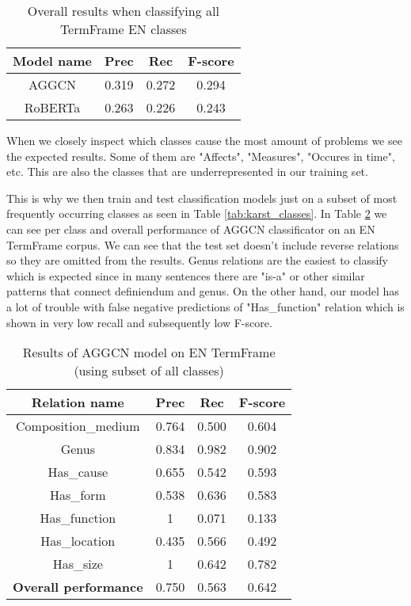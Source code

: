 \documentclass[fleqn,moreauthors,10pt]{ds_report}
\begin{document}
\begin{table}[h]
    \centering
    \begin{tabular}{|c|c|c|c|}
        \hline
        \textbf{Model name} & \textbf{Prec} & \textbf{Rec} & \textbf{F-score} \\ \hline \hline
        AGGCN        &  0.319  &  0.272  &  0.294 \\ \hline
        RoBERTa     &  0.263  &  0.226  &  0.243 \\ \hline
    \end{tabular}
    \caption{Overall results when classifying all TermFrame EN classes}
    \label{tab:karst_all}
\end{table}

\par When we closely inspect which classes cause the most amount of problems we see the expected results. Some of them are "Affects", "Measures", "Occures in time", etc. This are also the classes that are underrepresented in our training set.

\par This is why we then train and test classification models just on a subset of most frequently occurring classes as seen in Table \ref{tab:karst_classes}. In Table \ref{tab:karst_subset} we can see per class and overall performance of AGGCN classificator on an EN TermFrame corpus. We can see that the test set doesn't include reverse relations so they are omitted from the results. Genus relations are the easiest to classify which is expected since in many sentences there are "is-a" or other similar patterns that connect definiendum and genus. On the other hand, our model has a lot of trouble with false negative predictions of "Has\_function" relation which is shown in very low recall and subsequently low F-score.

\begin{table}[!ht]
    \centering
    \begin{tabular}{|c|c|c|c|}
        \hline
        \textbf{Relation name} & \textbf{Prec} & \textbf{Rec} & \textbf{F-score} \\ \hline \hline
        Composition\_medium  &  0.764  &  0.500  &  0.604 \\ \hline
        Genus               &  0.834  &  0.982  &  0.902 \\ \hline
        Has\_cause           &  0.655  &  0.542  &  0.593 \\ \hline
        Has\_form           &  0.538  &  0.636  &  0.583 \\ \hline
        Has\_function        & 1  &   0.071  &  0.133 \\ \hline
        Has\_location        &  0.435  &  0.566  &  0.492 \\ \hline
        Has\_size            & 1 &  0.642  &  0.782 \\ \hline \hline
        \textbf{Overall performance} & 0.750 & 0.563 & 0.642 \\ \hline
    \end{tabular}
    \caption{Results of AGGCN model on EN TermFrame (using subset of all classes)}
    \label{tab:karst_subset}
\end{table}
\end{document}
